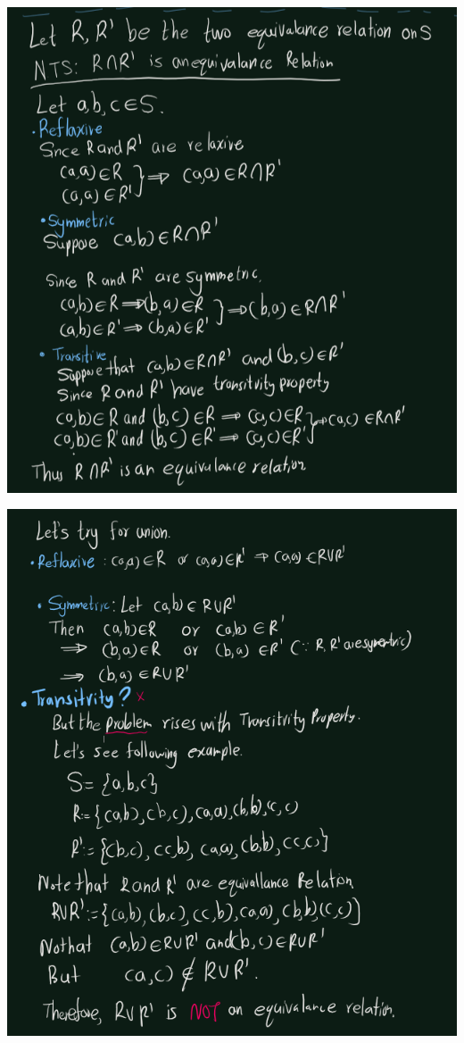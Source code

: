 \documentclass[
]{book}
\theoremstyle{definition}
\theoremstyle{definition}
\theoremstyle{definition}
\theoremstyle{definition}
\theoremstyle{remark}
\begin{document}
\includegraphics{figures/ch_2/fig95.png}

\includegraphics{figures/ch_2/fig96.png}
\end{document}
